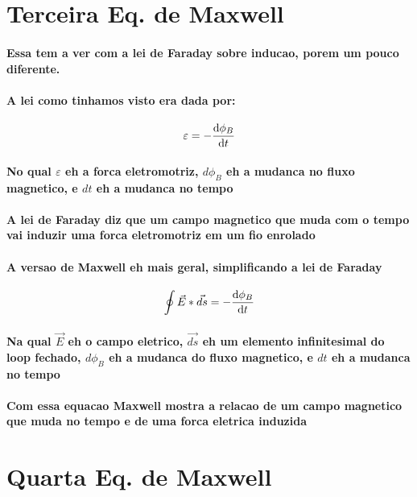 \documentclass[12pt,twoside, a4paper, twocolumn]{article}
\begin{document}
\section{Terceira Eq. de Maxwell}
\paragraph*{Essa tem a ver com a lei de Faraday sobre inducao, porem um pouco diferente.}
\paragraph*{A lei como tinhamos visto era dada por:}
\begin{equation}
    \varepsilon = - \frac{\mathrm d \phi_B}{\mathrm d t}
\end{equation}
\paragraph*{No qual $\varepsilon$ eh a forca eletromotriz, $d\phi_B$ eh a mudanca no fluxo magnetico, e $dt$ eh a mudanca no tempo}
\paragraph*{A lei de Faraday diz que um campo magnetico que muda com o tempo vai induzir uma forca eletromotriz em um fio enrolado}
\paragraph*{A versao de Maxwell eh mais geral, simplificando a lei de Faraday}
\begin{equation}
    \oint \vec{E} * \vec{ds} = - \frac{\mathrm d \phi_B}{\mathrm d t}
\end{equation}
\paragraph*{Na qual $\vec{E}$ eh o campo eletrico, $\vec{ds}$ eh um elemento infinitesimal do loop fechado, $d\phi_B$ eh a mudanca do fluxo magnetico, e $dt$ eh a mudanca no tempo}
\paragraph*{Com essa equacao Maxwell mostra a relacao de um campo magnetico que muda no tempo e de uma forca eletrica induzida}

\section{Quarta Eq. de Maxwell}
\end{document}
